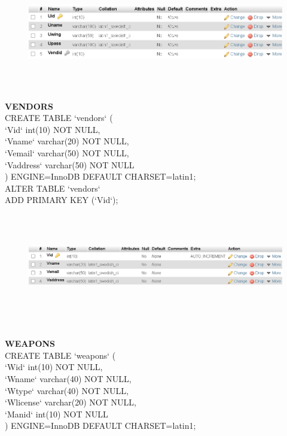 \documentclass[12pt,a4paper]{report}
\begin{document}
\begin{figure}[hbtp]
\centering
\includegraphics[width=6.0in,height=2in]{../fig/User}\\
\end{figure}
\newpage
\textbf{VENDORS}\\
CREATE TABLE `vendors` (\\
  `Vid` int(10) NOT NULL,\\
  `Vname` varchar(20) NOT NULL,\\
  `Vemail` varchar(50) NOT NULL,\\
  `Vaddress` varchar(50) NOT NULL\\
) ENGINE=InnoDB DEFAULT CHARSET=latin1;\\
ALTER TABLE `vendors`\\
  ADD PRIMARY KEY (`Vid`);
\begin{figure}[hbtp]
\centering
\includegraphics[width=6.0in,height=1.75in]{../fig/Vendor}\\
\end{figure}\\
\newpage
\textbf{WEAPONS}\\
CREATE TABLE `weapons` (\\
  `Wid` int(10) NOT NULL,\\
  `Wname` varchar(40) NOT NULL,\\
  `Wtype` varchar(40) NOT NULL,\\
  `Wlicense` varchar(20) NOT NULL,\\
  `Manid` int(10) NOT NULL\\
) ENGINE=InnoDB DEFAULT CHARSET=latin1;\\
\end{document}
